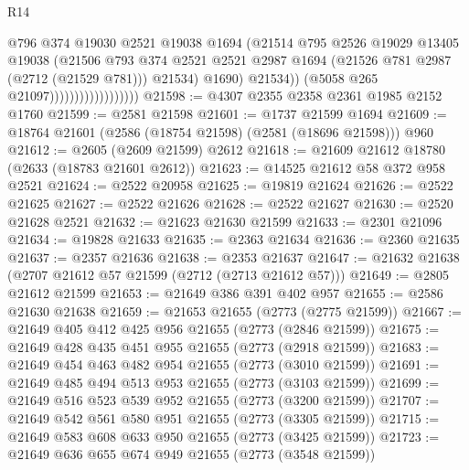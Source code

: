 \begin{lexlean}{R14}
\begin{coremodule}
                                          @796
                                          @374
                                          @19030
                                          @2521
                                          @19038
                                          @1694
                                          (@21514
                                            @795
                                            @2526
                                            @19029
                                            @13405
                                            @19038
                                            (@21506
                                              @793
                                              @374
                                              @2521
                                              @2521
                                              @2987
                                              @1694
                                              (@21526 @781 @2987 (@2712 (@21529 @781)))
                                              @21534)
                                            @1690)
                                          @21534))
                                      (@5058 @265 @21097))))))))))))))))))
@21598 := @4307 @2355 @2358 @2361 @1985 @2152 @1760
@21599 := @2581 @21598
@21601 := @1737 @21599 @1694
@21609 := @18764 @21601 (@2586 (@18754 @21598) (@2581 (@18696 @21598))) @960
@21612 := @2605 (@2609 @21599) @2612
@21618 := @21609 @21612 @18780 (@2633 (@18783 @21601 @2612))
@21623 := @14525 @21612 @58 @372 @958 @2521
@21624 := @2522 @20958
@21625 := @19819 @21624
@21626 := @2522 @21625
@21627 := @2522 @21626
@21628 := @2522 @21627
@21630 := @2520 @21628 @2521
@21632 := @21623 @21630 @21599
@21633 := @2301 @21096
@21634 := @19828 @21633
@21635 := @2363 @21634
@21636 := @2360 @21635
@21637 := @2357 @21636
@21638 := @2353 @21637
@21647 := @21632 @21638 (@2707 @21612 @57 @21599 (@2712 (@2713 @21612 @57)))
@21649 := @2805 @21612 @21599
@21653 := @21649 @386 @391 @402 @957
@21655 := @2586 @21630 @21638
@21659 := @21653 @21655 (@2773 (@2775 @21599))
@21667 := @21649 @405 @412 @425 @956 @21655 (@2773 (@2846 @21599))
@21675 := @21649 @428 @435 @451 @955 @21655 (@2773 (@2918 @21599))
@21683 := @21649 @454 @463 @482 @954 @21655 (@2773 (@3010 @21599))
@21691 := @21649 @485 @494 @513 @953 @21655 (@2773 (@3103 @21599))
@21699 := @21649 @516 @523 @539 @952 @21655 (@2773 (@3200 @21599))
@21707 := @21649 @542 @561 @580 @951 @21655 (@2773 (@3305 @21599))
@21715 := @21649 @583 @608 @633 @950 @21655 (@2773 (@3425 @21599))
@21723 := @21649 @636 @655 @674 @949 @21655 (@2773 (@3548 @21599))

\end{coremodule}
\end{lexlean}
